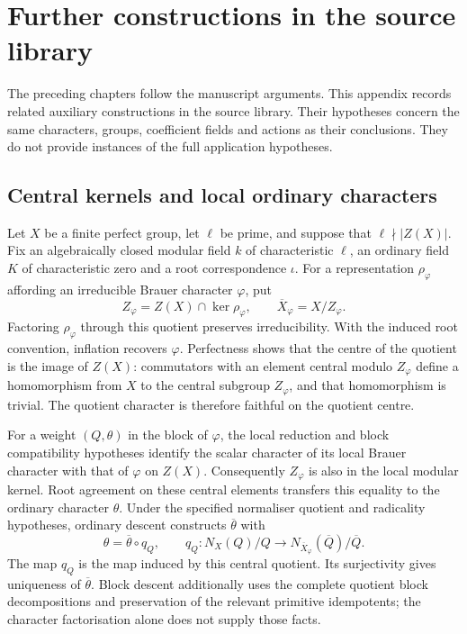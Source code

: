 \chapter{Further constructions in the source library}
\label{app:construction-details}

The preceding chapters follow the manuscript arguments. This appendix
records related auxiliary constructions in the source library. Their
hypotheses concern the same characters, groups, coefficient fields and
actions as their conclusions. They do not provide instances of the full
application hypotheses.

\section{Central kernels and local ordinary characters}

Let $X$ be a finite perfect group, let $\ell$ be prime, and suppose that
$\ell\nmid |Z(X)|$. Fix an algebraically closed modular field $k$ of characteristic $\ell$,
an ordinary field $K$ of characteristic zero and a root correspondence
$\iota$. For a representation $\rho_\varphi$ affording an irreducible
Brauer character $\varphi$, put
\[
 Z_\varphi=Z(X)\cap\ker\rho_\varphi,
 \qquad \overline X_\varphi=X/Z_\varphi.
\]
Factoring $\rho_\varphi$ through this quotient preserves irreducibility.
With the induced root convention, inflation recovers $\varphi$.
Perfectness shows that the centre of the quotient is the image of
$Z(X)$: commutators with an element central modulo $Z_\varphi$ define
a homomorphism from $X$ to the central subgroup $Z_\varphi$, and that
homomorphism is trivial. The quotient character is therefore faithful
on the quotient centre.

For a weight $(Q,\theta)$ in the block of $\varphi$, the local reduction
and block compatibility hypotheses identify the scalar character of
its local Brauer character with that of $\varphi$ on $Z(X)$.
Consequently $Z_\varphi$ is also in the local modular kernel. Root
agreement on these central elements transfers this equality to the
ordinary character $\theta$. Under the specified normaliser quotient
and radicality hypotheses, ordinary descent constructs
$\overline\theta$ with
\[
 \theta=\overline\theta\circ q_Q,
 \qquad
 q_Q:N_X(Q)/Q\longrightarrow
 N_{\overline X_\varphi}(\overline Q)/\overline Q.
\]
The map $q_Q$ is the map induced by this central quotient.
Its surjectivity gives uniqueness of $\overline\theta$.
Block descent additionally uses the complete quotient block
decompositions and preservation of the relevant primitive idempotents;
the character factorisation alone does not supply those facts.

